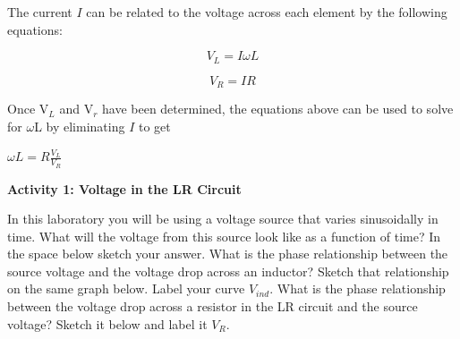 The current $I$ can be related to the voltage across each element by
the following equations:

\[
V_{L}=I\omega L\]


\[
V_{R}=IR\]




Once V\( _{L} \) and V\( _{r} \) have been determined, the equations
above can be used to solve for \( \omega  \)L by eliminating
$I$ to get 

{\centering \( \omega L=R\frac{V_{L}}{V_{R}} \) \par}


\vspace{0.3cm}
{\centering {} \par}
\vspace{0.3cm}

\textbf{Activity 1: Voltage in the LR Circuit }

In this laboratory you will be using a voltage source that varies
sinusoidally in time.
What will the voltage from this source look like as a function
of time?
In the space below sketch your answer.
What is the phase relationship between the source voltage and the
voltage drop across an inductor?
Sketch that relationship on the same graph below.
Label your curve $V_{ind}$.
What is the phase relationship between the voltage drop
across a resistor in the LR circuit and the source voltage?
Sketch it below and label it $V_R$.

\vspace{0.3cm}
{\centering {} \par}
\vspace{0.3cm}

